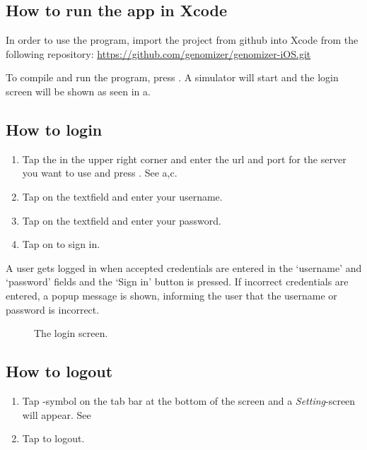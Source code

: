 \subsection{How to run the app in Xcode}
In order to use the program, import the project from github into Xcode from the following repository:
\url{https://github.com/genomizer/genomizer-iOS.git} 

To compile and run the program, press . A simulator will start and the login screen will be shown as seen in a.

\subsection{How to login}

\begin{enumerate}
\item Tap the  in the upper right corner and enter the url and port for the server you want to use and press . See a,c.
\item Tap on the  textfield and enter your username.
\item Tap on the  textfield and enter your password.
\item Tap on  to sign in.
\end{enumerate}
A user gets logged in when accepted credentials are entered in the ‘username’ and ‘password’ fields and the ‘Sign in’ button is pressed. If incorrect credentials are entered, a popup message is shown, informing the user that the username or password is incorrect.

\begin{figure}[ht]
\caption{The login screen.}
\label{fig:ios_login}
\end{figure}
\FloatBarrier

\subsection{How to logout}
\begin{enumerate}
\item Tap -symbol on the tab bar at the bottom of the screen and a \emph{Setting}-screen will appear. See 
\item Tap  to logout.
\end{enumerate}

